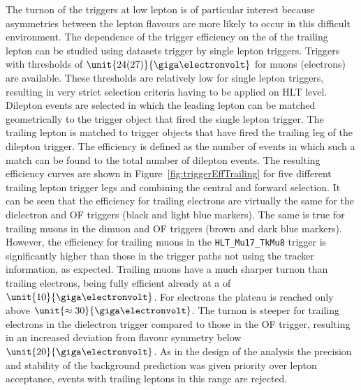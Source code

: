 The turnon of the triggers at low lepton \pt is of particular interest because asymmetries between the lepton flavours are more likely to occur in this difficult environment. The dependence of the trigger efficiency on the \pt of the trailing lepton can be studied using datasets trigger by single lepton triggers. Triggers with \pt thresholds of $\unit{24(27)}{\giga\electronvolt}$ for muons (electrons) are available. These thresholds are relatively low for single lepton triggers, resulting in very strict selection criteria having to be applied on HLT level. Dilepton events are selected in which the leading lepton can be matched  geometrically to the trigger object that fired the single lepton trigger. The trailing lepton is matched to trigger objects that have fired the trailing leg of the dilepton trigger. The efficiency is defined as the number of events in which such a match can be found to the total number of dilepton events. The resulting efficiency curves are shown in Figure~\ref{fig:triggerEffTrailing} for five different trailing lepton trigger legs and combining the central and forward selection. It can be seen that the efficiency for trailing electrons are virtually the same for the dielectron and OF triggers (black and light blue markers). The same is true for trailing muons in the dimuon and OF triggers (brown and dark blue markers). However, the efficiency for trailing muons in the \verb+HLT_Mu17_TkMu8+ trigger is significantly higher than those in the trigger paths not using the tracker information, as expected. Trailing muons have a much sharper turnon than trailing electrons, being fully efficient already at a \pt of $\unit{10}{\giga\electronvolt}$. For electrons the plateau is reached only above $\unit{\approx 30}{\giga\electronvolt}$. The turnon is steeper for trailing electrons in the dielectron trigger compared to those in the OF trigger, resulting in an increased deviation from flavour symmetry below $\unit{20}{\giga\electronvolt}$. As in the design of the analysis the precision and stability of the background prediction was given priority over lepton acceptance, events with trailing leptons in this \pt range are rejected.  
